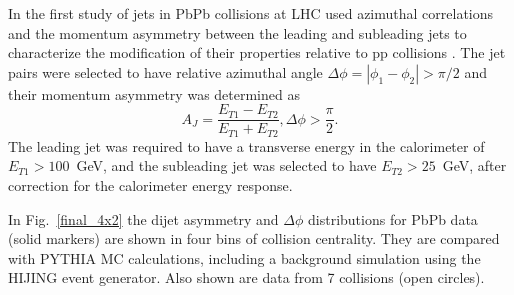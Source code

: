 In the first study of jets in PbPb collisions at LHC used azimuthal correlations and the 
momentum asymmetry between the leading and subleading jets to characterize the modification
of their properties relative to pp collisions \cite{Aad:2010bu}.
The jet pairs were selected to have relative azimuthal angle $\Delta \phi =|\phi_1-\phi_2| > \pi/2$
and their momentum asymmetry was determined as
\begin{equation}
A_J = \frac{E_{T1}-E_{T2}}{E_{T1}+E_{T2}}, \Delta\phi > \frac{\pi}{2}.
\end{equation}
The leading jet was required to have a transverse energy in the calorimeter of $E_{T1} > 100$~GeV,
and the subleading jet was selected to have $E_{T2} > 25$~GeV, after correction for 
the calorimeter energy response. 

In Fig.~\ref{final_4x2} the dijet asymmetry and $\Delta\phi$ distributions for PbPb data (solid markers) 
are shown in four bins of collision centrality. They are compared with PYTHIA MC calculations, including a 
background simulation using the HIJING event generator. Also shown are data from 7\TeV 
\pp collisions (open circles).
